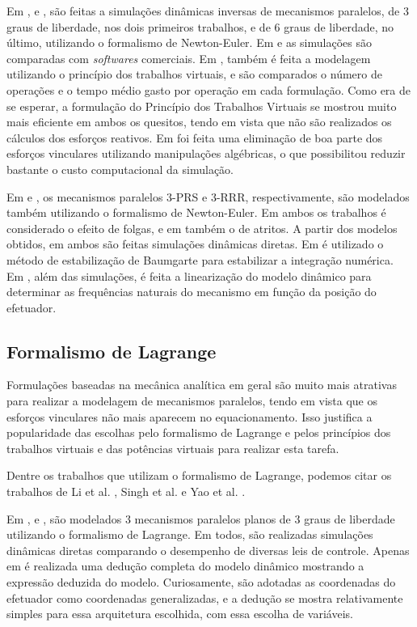 \documentclass[]{politex}
\begin{document}
Em \cite{Arian}, \cite{LiWang} e \cite{Dasgupta}, são feitas a simulações dinâmicas inversas de mecanismos paralelos, de 3 graus de liberdade, nos dois primeiros trabalhos, e de 6 graus de liberdade, no último, utilizando o formalismo de Newton-Euler. Em \cite{Arian} e \cite{LiWang} as simulações são comparadas com \emph{softwares} comerciais. Em \cite{Arian}, também é feita a modelagem utilizando o princípio dos trabalhos virtuais, e são comparados o número de operações e o tempo médio gasto por operação em cada formulação. Como era de se esperar, a formulação do Princípio dos Trabalhos Virtuais se mostrou muito mais eficiente em ambos os quesitos, tendo em vista que não são realizados os cálculos dos esforços reativos. Em \cite{Dasgupta} foi feita uma eliminação de boa parte dos esforços vinculares utilizando manipulações algébricas, o que possibilitou reduzir bastante o custo computacional da simulação.

Em \cite{Shiau} e \cite{Zhang}, os mecanismos paralelos 3-PRS e 3-RRR, respectivamente, são modelados  também utilizando o formalismo de Newton-Euler. Em ambos os trabalhos é considerado o efeito de folgas, e em \cite{Shiau} também o de atritos. A partir dos modelos obtidos, em ambos são feitas simulações dinâmicas diretas. Em \cite{Zhang} é utilizado o método de estabilização de Baumgarte \cite{Baumgarte} para estabilizar a integração numérica. Em \cite{Shiau}, além das simulações, é feita a linearização do modelo dinâmico para determinar as frequências naturais do mecanismo em função da posição do efetuador.

\subsection{Formalismo de Lagrange}

Formulações baseadas na mecânica analítica em geral são muito mais atrativas para realizar a modelagem de mecanismos paralelos, tendo em vista que os esforços vinculares não mais aparecem no equacionamento. Isso justifica a popularidade das escolhas pelo formalismo de Lagrange e pelos princípios dos trabalhos virtuais e das potências virtuais para realizar esta tarefa.

Dentre os trabalhos que utilizam o formalismo de Lagrange, podemos citar os trabalhos de  Li et al. \cite{Li3}, Singh et al. \cite{Singh, Singh2, Singh3} e Yao et al. \cite{Yao}.

Em \cite{Singh}, \cite{Singh2} e \cite{Singh3}, são modelados 3 mecanismos paralelos planos de 3 graus de liberdade utilizando o formalismo de Lagrange. Em todos, são realizadas simulações dinâmicas diretas comparando o desempenho de diversas leis de controle. Apenas em \cite{Singh2} é realizada uma dedução completa do modelo dinâmico mostrando a expressão deduzida do modelo. Curiosamente, são adotadas as coordenadas do efetuador como coordenadas generalizadas, e a dedução se mostra relativamente simples para essa arquitetura escolhida, com essa escolha de variáveis.
\end{document}
